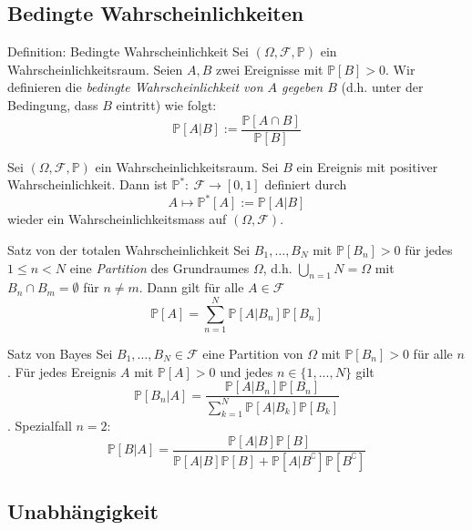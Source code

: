 \documentclass[a4paper,10pt]{article}
\def\P{\mathbb{P}}
\begin{document}
\subsection{Bedingte Wahrscheinlichkeiten}

\begin{mainbox}{Definition: Bedingte Wahrscheinlichkeit}
    Sei \( (\Omega, \mathcal{F}, \P) \) ein Wahrscheinlichkeitsraum. Seien \( A, B \) zwei Ereignisse mit \( \P[B] > 0 \). Wir definieren die \emph{bedingte Wahrscheinlichkeit von \( A \) gegeben \( B \)} (d.h. unter der Bedingung, dass \( B \) eintritt) wie folgt:
    \[ \P[A | B] := \frac{\P[A \cap B]}{\P[B]} \]
\end{mainbox}

\begin{subbox}{}
    Sei \( (\Omega, \mathcal{F}, \P) \) ein Wahrscheinlichkeitsraum. Sei \( B \) ein Ereignis mit positiver Wahrscheinlichkeit. Dann ist \( \P^*: \: \mathcal{F} \to [0, 1] \) definiert durch \[ A \mapsto \P^*[A] := \P[A | B] \] wieder ein Wahrscheinlichkeitsmass auf \( (\Omega, \mathcal{F}) \).
\end{subbox}

\begin{subbox}{Satz von der totalen Wahrscheinlichkeit}
    Sei \( B_1, \dots, B_N \) mit \( \P[B_n] > 0 \) für jedes \( 1 \leq n < N \) eine \emph{Partition} des Grundraumes \( \Omega \), d.h. \( \bigcup_{n=1}{N} = \Omega \) mit \( B_n \cap B_m = \emptyset  \) für \( n \neq m \). Dann gilt für alle \( A \in \mathcal{F} \) \[ \P[A] = \sum_{n = 1}^N \P \left[ A | B_n \right] \P \left[ B_n \right] \]
\end{subbox}

\begin{subbox}{Satz von Bayes}
    Sei \( B_1, \dots, B_N \in \mathcal{F} \) eine Partition von \( \Omega \) mit \( \P \left[ B_n \right] > 0 \) für alle \( n \). Für jedes Ereignis \( A \) mit \( \P[A] > 0 \) und jedes \( n \in \{1, ..., N\} \) gilt
    \[ \P \left[ B_n | A \right] = \frac{\P \left[A | B_n \right] \P \left[ B_n \right]}{\sum_{k = 1}^N \P \left[ A | B_k \right] \P \left[ B_k \right]} \].
    Spezialfall \( n = 2 \):
    \[ \P[B | A] = \frac{\P[A | B] \P[B]}{\P[A | B] \P[B] + \P[A | B^\complement] \P[B^\complement]} \]
\end{subbox}


\subsection{Unabhängigkeit}
\end{document}
